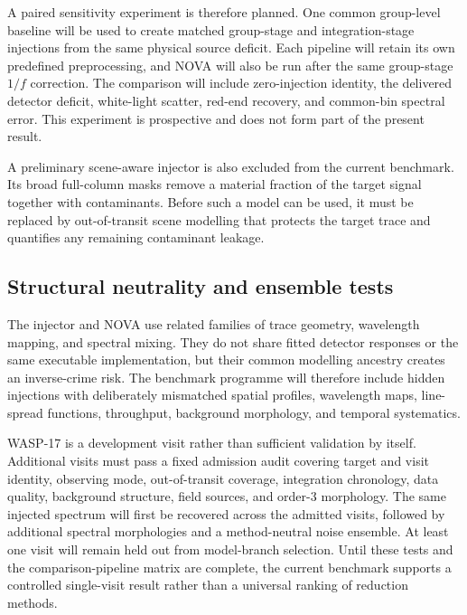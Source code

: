 A paired sensitivity experiment is therefore planned. One common group-level
baseline will be used to create matched group-stage and integration-stage
injections from the same physical source deficit. Each pipeline will retain
its own predefined preprocessing, and NOVA will also be run after the same
group-stage $1/f$ correction. The comparison will include zero-injection
identity, the delivered detector deficit, white-light scatter, red-end
recovery, and common-bin spectral error. This experiment is prospective and
does not form part of the present result.

A preliminary scene-aware injector is also excluded from the current
benchmark. Its broad full-column masks remove a material fraction of the
target signal together with contaminants. Before such a model can be used, it
must be replaced by out-of-transit scene modelling that protects the target
trace and quantifies any remaining contaminant leakage.

\subsection{Structural neutrality and ensemble tests}

The injector and NOVA use related families of trace geometry, wavelength
mapping, and spectral mixing. They do not share fitted detector responses or
the same executable implementation, but their common modelling ancestry creates
an inverse-crime risk. The benchmark programme will therefore include hidden
injections with deliberately mismatched spatial profiles, wavelength maps,
line-spread functions, throughput, background morphology, and temporal
systematics.

WASP-17 is a development visit rather than sufficient validation by itself.
Additional visits must pass a fixed admission audit covering target and visit
identity, observing mode, out-of-transit coverage, integration chronology,
data quality, background structure, field sources, and order-3 morphology. The
same injected spectrum will first be recovered across the admitted visits,
followed by additional spectral morphologies and a method-neutral noise
ensemble. At least one visit will remain held out from model-branch selection.
Until these tests and the comparison-pipeline matrix are complete, the current
benchmark supports a controlled single-visit result rather than a universal
ranking of reduction methods.

